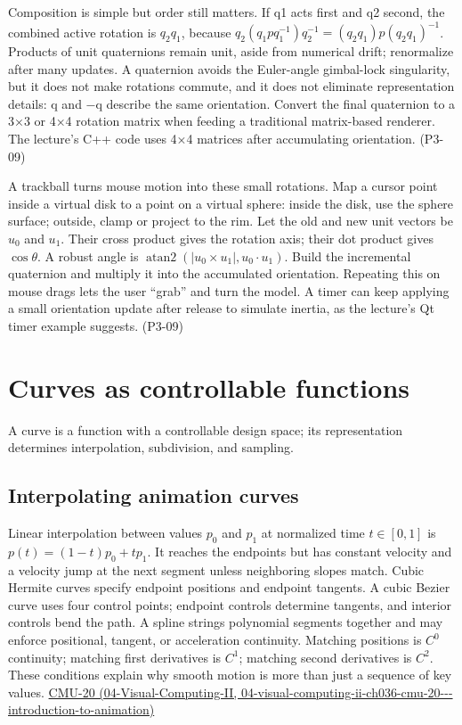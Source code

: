 Composition is simple but order still matters. If q1 acts first and q2 second, the combined active rotation is \(q_2q_1\), because \(q_2(q_1pq_1^{-1})q_2^{-1}=(q_2q_1)p(q_2q_1)^{-1}\). Products of unit quaternions remain unit, aside from numerical drift; renormalize after many updates. A quaternion avoids the Euler-angle gimbal-lock singularity, but it does not make rotations commute, and it does not eliminate representation details: q and −q describe the same orientation. Convert the final quaternion to a 3×3 or 4×4 rotation matrix when feeding a traditional matrix-based renderer. The lecture's C++ code uses 4×4 matrices after accumulating orientation. (P3-09)

A trackball turns mouse motion into these small rotations. Map a cursor point inside a virtual disk to a point on a virtual sphere: inside the disk, use the sphere surface; outside, clamp or project to the rim. Let the old and new unit vectors be \(u_0\) and \(u_1\). Their cross product gives the rotation axis; their dot product gives \(\cos\theta\). A robust angle is \(\operatorname{atan2}(|u_0\times u_1|,u_0\cdot u_1)\). Build the incremental quaternion and multiply it into the accumulated orientation. Repeating this on mouse drags lets the user ``grab'' and turn the model. A timer can keep applying a small orientation update after release to simulate inertia, as the lecture's Qt timer example suggests. (P3-09)

\section{Curves as controllable functions}\label{03-visual-computing-i-ch001-curves-as-controllable-functions}

A curve is a function with a controllable design space; its representation determines interpolation, subdivision, and sampling.

\subsection{Interpolating animation curves}\label{03-visual-computing-i-ch001-interpolating-animation-curves}

Linear interpolation between values \(p_0\) and \(p_1\) at normalized time \(t\in[0,1]\) is \(p(t)=(1-t)p_0+tp_1\). It reaches the endpoints but has constant velocity and a velocity jump at the next segment unless neighboring slopes match. Cubic Hermite curves specify endpoint positions and endpoint tangents. A cubic Bezier curve uses four control points; endpoint controls determine tangents, and interior controls bend the path. A spline strings polynomial segments together and may enforce positional, tangent, or acceleration continuity. Matching positions is \(C^0\) continuity; matching first derivatives is \(C^1\); matching second derivatives is \(C^2\). These conditions explain why smooth motion is more than just a sequence of key values. \href{../04-Visual-Computing-II/main.pdf\#nameddest=04-visual-computing-ii-ch036-cmu-20---introduction-to-animation}{CMU-20 (04-Visual-Computing-II, 04-visual-computing-ii-ch036-cmu-20-\/-\/-introduction-to-animation)}

